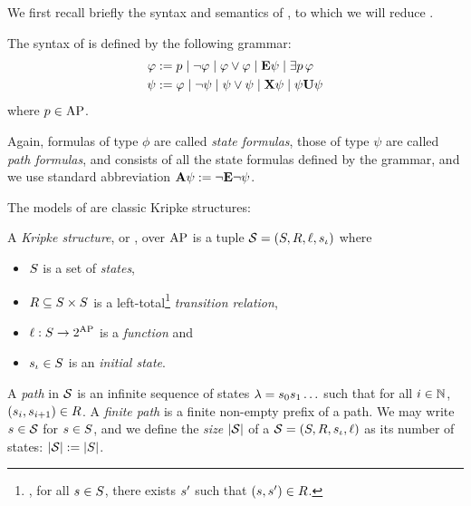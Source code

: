 We first recall briefly the syntax and semantics of \QCTLs, to which
we will reduce \SLref.



\begin{definition}%
  \label{def-syntax-QCTLs}
  The syntax of \QCTLs is defined by the following grammar:
  \begin{align*}
  \phi\egdef &\; p \mid \neg \phi \mid \phi\ou \phi \mid \E \psi \mid
  \existsp[p] \phi\\
    \psi\egdef &\; \phi \mid \neg \psi \mid \psi\ou \psi \mid \X \psi \mid
  \psi \until \psi
\end{align*}
where $p\in\APf$. 
\end{definition}

Again, formulas of type $\phi$ are called \emph{state formulas}, those of type $\psi$
are called \emph{path formulas}, and \QCTLs consists of all the state formulas
defined by the grammar, and   we use standard abbreviation 
$\A\psi \egdef \neg\E\neg\psi$.

The models of \QCTLs are classic Kripke structures:

\begin{definition}
A \emph{Kripke structure}, or \KS, over $\APf$ is a tuple 
$\KS=(\setstates,\relation,\lab,\sstate_\init)$ where
\begin{itemize}
\item $\setstates$  is a set of
\emph{states}, 
\item $\relation\subseteq\setstates\times\setstates$ is a
left-total\footnote{\ie, for all $\sstate\in\setstates$, there exists $\sstate'$
such that $(\sstate,\sstate')\in\relation$.} \emph{transition
relation}, 
\item $\lab:\setstates\to 2^{\APf}$ is a \emph{ function} and
\item $\sstate_\init \in \setstates$ is an \emph{initial state}.
\end{itemize}
\end{definition}

A \emph{path} in $\KS$  is an infinite sequence of states
$\spath=\sstate_{0}\sstate_{1}\ldots$ such that
 for all $i\in\setn$,
$(\sstate_{i},\sstate_{i+1})\in \relation$. 
A \emph{finite path} is a finite non-empty prefix of a path.
We may write $\sstate\in\KS$ for $\sstate\in\setstates$, and we
define the \emph{size} $|\KS|$ of a \KS
$\KS=(\setstates,\relation,\sstate_\init,\lab)$ as its number of states: $|\KS|\egdef
|\setstates|$. 

